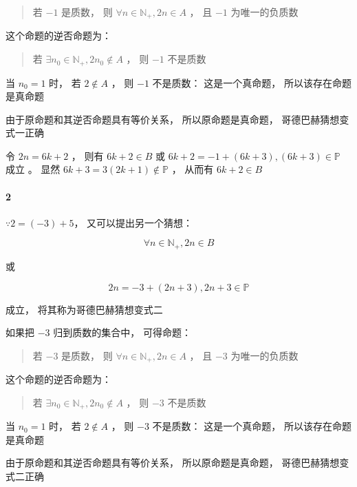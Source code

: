 \documentclass[11pt]{article}
\begin{document}
\begin{quotation}
	若 $-1$ 是质数， 则 $\forall{n}\in\mathbb{N}_+,2n\in{A}$ ， 且 $-1$ 为唯一的负质数
\end{quotation}

这个命题的逆否命题为：

\begin{quotation}
	若 $\exists{n_0}\in\mathbb{N}_+,2n_0\notin{A}$ ， 则 $-1$ 不是质数
\end{quotation}

当 $n_0=1$ 时， 若 $2\notin{A}$ ， 则 $-1$ 不是质数： 这是一个真命题， 所以该存在命题是真命题

由于原命题和其逆否命题具有等价关系， 所以原命题是真命题， 哥德巴赫猜想变式一正确

令 $2n=6k+2$ ， 则有 $6k+2\in{B}$ 或 $6k+2=-1+(6k+3), (6k+3)\in\mathbb{P}$ 成立 。 显然 $6k+3=3(2k+1)\notin\mathbb{P}$ ， 从而有 $6k+2\in{B}$

\paragraph{2}

$\because{2=(-3)+5}$， 又可以提出另一个猜想：

\begin{equation}
	\forall{n}\in\mathbb{N}_+,2n\in{B}
\end{equation}

或

\begin{equation}
	2n=-3+(2n+3),2n+3\in\mathbb{P}
\end{equation}

成立， 将其称为哥德巴赫猜想变式二

如果把 $-3$ 归到质数的集合中， 可得命题：

\begin{quotation}
	若 $-3$ 是质数， 则 $\forall{n}\in\mathbb{N}_+,2n\in{A}$ ， 且 $-3$ 为唯一的负质数
\end{quotation}

这个命题的逆否命题为：

\begin{quotation}
	若 $\exists{n_0}\in\mathbb{N}_+,2n_0\notin{A}$ ， 则 $-3$ 不是质数
\end{quotation}


当 $n_0=1$ 时， 若 $2\notin{A}$ ， 则 $-3$ 不是质数： 这是一个真命题， 所以该存在命题是真命题

由于原命题和其逆否命题具有等价关系， 所以原命题是真命题， 哥德巴赫猜想变式二正确
\end{document}
